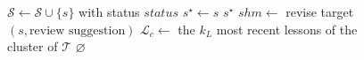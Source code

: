\begin{figure}[tp!]
\begin{algorithm}[t]
\begin{algorithmic}[1]
      \State $\mathcal{S} \gets \mathcal{S} \cup \{s\}$ with status $\mathit{status}$
      \State $s^{\star} \gets s$
      \State \Return $s^{\star}$
    \EndIf
      \State $\mathit{shm} \gets$ revise target $(s, \text{review suggestion})$
    \EndIf
  \EndFor
  \State $\mathcal{L}_{c} \gets$ the $k_{L}$ most recent lessons of the cluster of $\mathcal{T}$
\EndFor
\State \Return $\varnothing$
\end{algorithmic}
\end{algorithm}
\endgroup
\end{figure}

